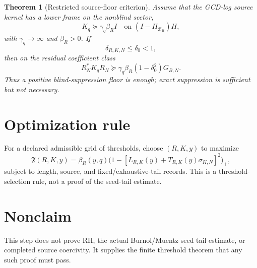 \documentclass[11pt]{article}
\newtheorem{theorem}{Theorem}
\begin{document}
\begin{theorem}[Restricted source-floor criterion]
Assume that the GCD-log source kernel has a lower frame on the nonblind sector,
\[
K_q\succeq \gamma_q\beta_R I
\quad\text{on }(I-\Pi_{\mathcal B_R})H,
\]
with $\gamma_q\to\infty$ and $\beta_R>0$. If
\[
\delta_{R,K,N}\le\delta_0<1,
\]
then on the residual coefficient class
\[
R_N^*K_qR_N\succeq \gamma_q\beta_R(1-\delta_0^2)G_{B,N}.
\]
Thus a positive blind-suppression floor is enough; exact suppression is sufficient but not necessary.
\end{theorem}

\section{Optimization rule}
For a declared admissible grid of thresholds, choose $(R,K,y)$ to maximize
\[
\mathfrak F(R,K,y)=\beta_R(y,q)\bigl(1-[L_{R,K}(y)+T_{R,K}(y)\sigma_{K,N}]^2\bigr)_+,
\]
subject to length, source, and fixed/exhaustive-tail records. This is a threshold-selection rule, not a proof of the seed-tail estimate.

\section{Nonclaim}
This step does not prove RH, the actual Burnol/Muentz seed tail estimate, or completed source coercivity. It supplies the finite threshold theorem that any such proof must pass.
\end{document}
